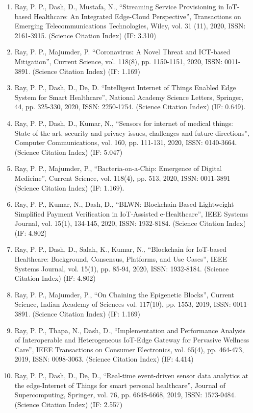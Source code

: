 \documentclass[11pt,a4paper]{moderncv}
\begin{document}
\begin{adjustwidth}{6em}{0pt}
\begin{enumerate}
		\item Ray, P. P., Dash, D., Mustafa, N., “Streaming Service Provisioning in IoT-based Healthcare: An Integrated Edge-Cloud Perspective”, Transactions on Emerging Telecommunications Technologies, Wiley, vol. 31 (11), 2020, ISSN: 2161-3915. (Science Citation Index) (IF: 3.310) 
		\item Ray, P. P., Majumder, P. “Coronavirus: A Novel Threat and ICT-based Mitigation”, Current Science, vol. 118(8), pp. 1150-1151, 2020, ISSN: 0011-3891. (Science Citation Index) (IF: 1.169)
		\item Ray, P. P., Dash, D., De, D. “Intelligent Internet of Things Enabled Edge System for Smart Healthcare”, National Academy Science Letters, Springer, 44, pp. 325-330, 2020, ISSN: 2250-1754. (Science Citation Index) (IF: 0.649).
		\item Ray, P. P., Dash, D., Kumar, N., “Sensors for internet of medical things: State-of-the-art, security and privacy issues, challenges and future directions”, Computer Communications, vol. 160, pp. 111-131, 2020, ISSN: 0140-3664. (Science Citation Index) (IF: 5.047) 
		\item Ray, P. P., Majumder, P., “Bacteria-on-a-Chip: Emergence of Digital Medicine”, Current Science, vol. 118(4), pp. 513, 2020, ISSN: 0011-3891 (Science Citation Index) (IF: 1.169). 
		\item Ray, P. P., Kumar, N., Dash, D., “BLWN: Blockchain-Based Lightweight Simplified Payment Verification in IoT-Assisted e-Healthcare”, IEEE Systems Journal, vol. 15(1), 134-145, 2020, ISSN: 1932-8184. (Science Citation Index) (IF: 4.802) 
		\item Ray, P. P., Dash, D., Salah, K., Kumar, N., “Blockchain for IoT-based Healthcare: Background, Consensus, Platforms, and Use Cases”, IEEE Systems Journal, vol. 15(1), pp. 85-94, 2020, ISSN: 1932-8184. (Science Citation Index) (IF: 4.802) 
		\item Ray, P. P., Majumder, P., “On Chaining the Epigenetic Blocks”, Current Science, Indian Academy of Sciences vol. 117(10), pp. 1553, 2019, ISSN: 0011-3891. (Science Citation Index) (IF: 1.169)
		\item Ray, P. P., Thapa, N., Dash, D., “Implementation and Performance Analysis of Interoperable and Heterogeneous IoT-Edge Gateway for Pervasive Wellness Care”, IEEE Transactions on Consumer Electronics, vol. 65(4), pp. 464-473, 2019, ISSN: 0098-3063. (Science Citation Index) (IF: 4.414) 
		\item Ray, P. P., Dash, D., De, D., “Real-time event-driven sensor data analytics at the edge-Internet of Things for smart personal healthcare”, Journal of Supercomputing, Springer, vol. 76, pp. 6648-6668, 2019, ISSN: 1573-0484. (Science Citation Index) (IF: 2.557) 

\end{enumerate}
\end{adjustwidth}
\end{document}
